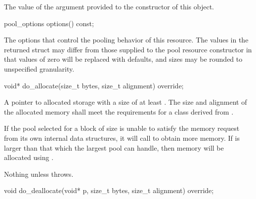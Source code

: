 \begin{itemdescr}
\pnum
\returns
The value of the  argument
provided to the constructor of this object.
\end{itemdescr}

%
%
\begin{itemdecl}
pool_options options() const;
\end{itemdecl}

\begin{itemdescr}
\pnum
\returns
The options that control the pooling behavior of this resource.
The values in the returned struct may differ
from those supplied to the pool resource constructor in that
values of zero will be replaced with 
defaults, and sizes may be rounded to unspecified granularity.
\end{itemdescr}

%
%
\begin{itemdecl}
void* do_allocate(size_t bytes, size_t alignment) override;
\end{itemdecl}

\begin{itemdescr}
\pnum
\returns
A pointer to allocated storage
with a size of at least .
The size and alignment of the allocated memory shall meet the requirements
for a class derived from .

\pnum
\effects
If the pool selected for a block of size 
is unable to satisfy the memory request from its own internal data structures,
it will call  to obtain more memory.
If  is larger than that which the largest pool can handle,
then memory will be allocated using .

\pnum
\throws
Nothing unless  throws.
\end{itemdescr}

%
%
\begin{itemdecl}
void do_deallocate(void* p, size_t bytes, size_t alignment) override;
\end{itemdecl}

